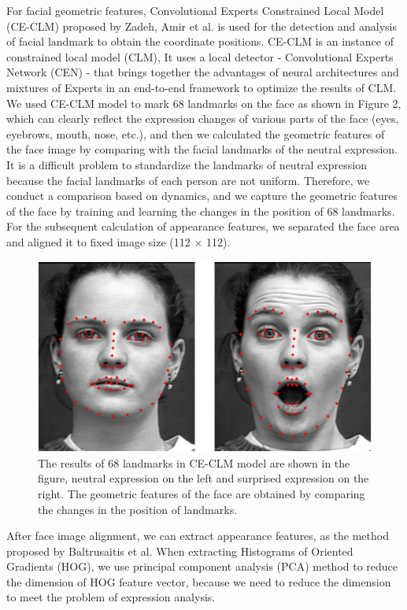 \documentclass[10pt, conference, compsocconf]{IEEEtran}
\begin{document}
For facial geometric features, Convolutional Experts Constrained Local Model (CE-CLM) proposed by Zadeh, Amir\cite{zadeh2017convolutional} et al. is used for the detection and analysis of facial landmark to obtain the coordinate positions. CE-CLM is an instance of constrained local model (CLM)\cite{Cristinacce2006Feature}, It uses a local detector - Convolutional Experts Network (CEN) - that brings together the advantages of neural architectures and mixtures of Experts in an end-to-end framework to optimize the results of CLM. We used CE-CLM model to mark 68 landmarks on the face as shown in Figure 2, which can clearly reflect the expression changes of various parts of the face (eyes, eyebrows, mouth, nose, etc.), and then we calculated the geometric features of the face image by comparing with the facial landmarks of the neutral expression. It is a difficult problem to standardize the landmarks of neutral expression because the facial landmarks of each person are not uniform. Therefore, we conduct a comparison based on dynamics, and we capture the geometric features of the face by training and learning the changes in the position of 68 landmarks. For the subsequent calculation of appearance features, we separated the face area and aligned it to fixed image size (112 $\times$ 112).

\begin{figure}[h]
	\centering
	\includegraphics[width=\linewidth]{CECLM}
	\caption{The results of 68 landmarks in CE-CLM model are shown in the figure, neutral expression on the left and surprised expression on the right. The geometric features of the face are obtained by comparing the changes in the position of landmarks.}
\end{figure}

After face image alignment, we can extract appearance features, as the method proposed by Baltrusaitis\cite{Baltrusaitis2015Cross} et al. When extracting Histograms of Oriented Gradients (HOG), we use principal component analysis (PCA) method to reduce the dimension of HOG feature vector, because we need to reduce the dimension to meet the problem of expression analysis.
\end{document}
